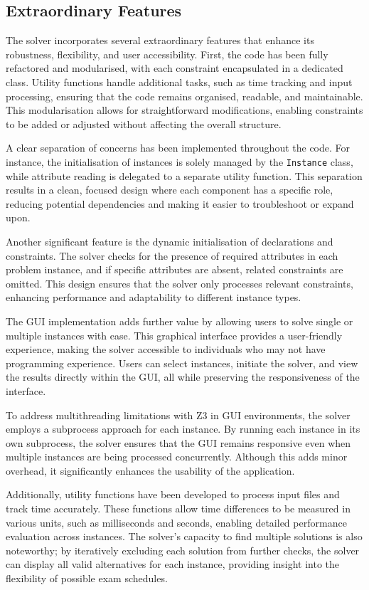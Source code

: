 \documentclass[a4paper]{article}
\begin{document}
    \subsection{Extraordinary Features}
    The solver incorporates several extraordinary features that enhance its robustness, flexibility, and user accessibility. First, the code has been fully refactored and modularised, with each constraint encapsulated in a dedicated class. Utility functions handle additional tasks, such as time tracking and input processing, ensuring that the code remains organised, readable, and maintainable. This modularisation allows for straightforward modifications, enabling constraints to be added or adjusted without affecting the overall structure.
    
    A clear separation of concerns has been implemented throughout the code. For instance, the initialisation of instances is solely managed by the \texttt{Instance} class, while attribute reading is delegated to a separate utility function. This separation results in a clean, focused design where each component has a specific role, reducing potential dependencies and making it easier to troubleshoot or expand upon.
    
    Another significant feature is the dynamic initialisation of declarations and constraints. The solver checks for the presence of required attributes in each problem instance, and if specific attributes are absent, related constraints are omitted. This design ensures that the solver only processes relevant constraints, enhancing performance and adaptability to different instance types.
    
    The GUI implementation adds further value by allowing users to solve single or multiple instances with ease. This graphical interface provides a user-friendly experience, making the solver accessible to individuals who may not have programming experience. Users can select instances, initiate the solver, and view the results directly within the GUI, all while preserving the responsiveness of the interface.
    
    To address multithreading limitations with Z3 in GUI environments, the solver employs a subprocess approach for each instance. By running each instance in its own subprocess, the solver ensures that the GUI remains responsive even when multiple instances are being processed concurrently. Although this adds minor overhead, it significantly enhances the usability of the application.
    
    Additionally, utility functions have been developed to process input files and track time accurately. These functions allow time differences to be measured in various units, such as milliseconds and seconds, enabling detailed performance evaluation across instances. The solver’s capacity to find multiple solutions is also noteworthy; by iteratively excluding each solution from further checks, the solver can display all valid alternatives for each instance, providing insight into the flexibility of possible exam schedules.
    
\end{document}
